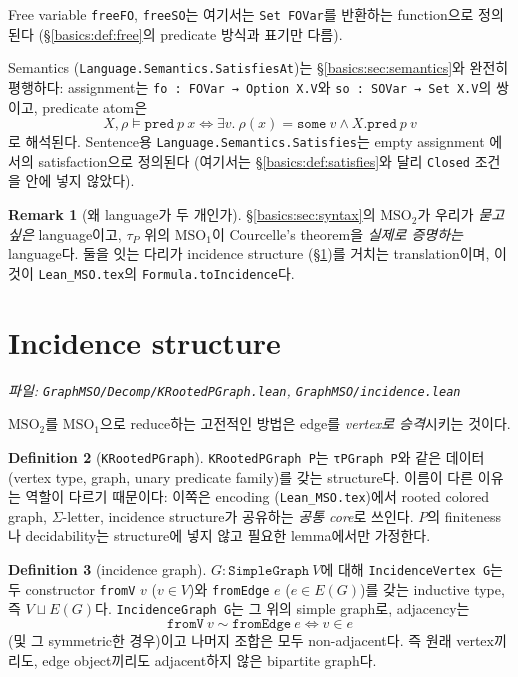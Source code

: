 \documentclass[11pt]{article}
\theoremstyle{definition}
\newtheorem{definition}{Definition}[section]
\newtheorem{remark}[definition]{Remark}
\theoremstyle{plain}
\newcommand{\MSOtwo}{\mathrm{MSO}_2}
\newcommand{\MSOone}{\mathrm{MSO}_1}
\newcommand{\lean}[1]{\texttt{#1}}
\newcommand{\leanfile}[1]{\texttt{#1}}
\begin{document}
Free variable \lean{freeFO}, \lean{freeSO}는 여기서는 \lean{Set FOVar}를
반환하는 function으로 정의된다 (\S\ref{basics:def:free}의 predicate 방식과
표기만 다름).

Semantics (\lean{Language.Semantics.SatisfiesAt})는
\S\ref{basics:sec:semantics}와 완전히 평행하다: assignment는
\lean{fo : FOVar → Option X.V}와 \lean{so : SOVar → Set X.V}의 쌍이고,
predicate atom은
\[
  X, \rho \models \lean{pred}\ p\ x \iff \exists v.\ \rho(x) = \lean{some}\ v \land X.\lean{pred}\ p\ v
\]
로 해석된다. Sentence용 \lean{Language.Semantics.Satisfies}는 empty assignment
에서의 satisfaction으로 정의된다 (여기서는 \S\ref{basics:def:satisfies}와 달리
\lean{Closed} 조건을 안에 넣지 않았다).

\begin{remark}[왜 language가 두 개인가]
\label{basics:rem:twolanguages}
\S\ref{basics:sec:syntax}의 $\MSOtwo$가 우리가 \emph{묻고 싶은} language이고,
$\tau_P$ 위의 $\MSOone$이 Courcelle's theorem을 \emph{실제로 증명하는}
language다. 둘을 잇는 다리가 incidence structure
(\S\ref{basics:sec:incidence})를 거치는 translation이며, 이것이
\leanfile{Lean\_MSO.tex}의 \lean{Formula.toIncidence}다.
\end{remark}

\section{Incidence structure}
\label{basics:sec:incidence}

\emph{파일: \leanfile{GraphMSO/Decomp/KRootedPGraph.lean},
\leanfile{GraphMSO/incidence.lean}}

$\MSOtwo$를 $\MSOone$으로 reduce하는 고전적인 방법은 edge를 \emph{vertex로
승격}시키는 것이다.

\begin{definition}[\lean{KRootedPGraph}]
\label{basics:def:krootedpgraph}
\lean{KRootedPGraph P}는 \lean{τPGraph P}와 같은 데이터 (vertex type, graph,
unary predicate family)를 갖는 structure다. 이름이 다른 이유는 역할이 다르기
때문이다: 이쪽은 encoding (\leanfile{Lean\_MSO.tex})에서 rooted colored graph,
$\Sigma$-letter, incidence structure가 공유하는 \emph{공통 core}로 쓰인다.
$P$의 finiteness나 decidability는 structure에 넣지 않고 필요한 lemma에서만
가정한다.
\end{definition}

\begin{definition}[incidence graph]
\label{basics:def:incidencegraph}
$G : \lean{SimpleGraph}\ V$에 대해 \lean{IncidenceVertex G}는 두 constructor
\lean{fromV} $v$ ($v \in V$)와 \lean{fromEdge} $e$ ($e \in E(G)$)를 갖는
inductive type, 즉 $V \sqcup E(G)$다. \lean{IncidenceGraph G}는 그 위의
simple graph로, adjacency는
\[
  \lean{fromV}\ v \sim \lean{fromEdge}\ e \iff v \in e
\]
(및 그 symmetric한 경우)이고 나머지 조합은 모두 non-adjacent다. 즉 원래
vertex끼리도, edge object끼리도 adjacent하지 않은 bipartite graph다.
\end{definition}
\end{document}
